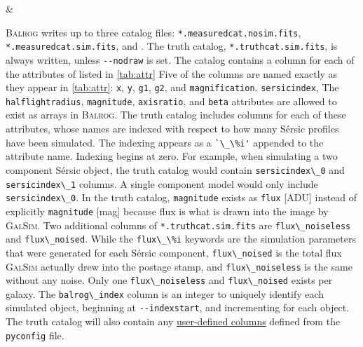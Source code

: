 \documentclass[11pt]{book}
\newcommand{\codett}[1]{\lstinline{#1}}
\newcommand{\galsim}{\textsc{GalSim}}
\newcommand{\balrog}{\textsc{Balrog}}
\newcommand{\opt}[1]{\codett{--#1}}
\newcommand{\sersic}{S\'{e}rsic}
\begin{document}
\begin{table}
\begin{longtabu}
 & \\
\bottomrule %
\end{longtabu}
\end{table}

\balrog{} writes up to three catalog files:
\codett{*.measuredcat.nosim.fits}, \codett{*.measuredcat.sim.fits}, and .
The truth catalog, \codett{*.truthcat.sim.fits}, is always written, unless \codett{--nodraw} is set.
The catalog contains a column for each of the attributes of listed in \autoref{tab:attr}
Five of the columns are named exactly as they appear in \autoref{tab:attr}: 
\codett{x}, \codett{y}, \codett{g1}, \codett{g2}, and \codett{magnification}.
\codett{sersicindex}, 
The \codett{halflightradius}, \codett{magnitude}, \codett{axisratio}, and \codett{beta}
attributes are allowed to exist as arrays in \balrog{}. 
The truth catalog includes columns for each of these attributes, whose names
are indexed with respect to how many \sersic{} profiles have been simulated.
The indexing appears as a \codett{`\_\%i'} appended to the attribute name.
Indexing begins at zero.
For example, when simulating a two component \sersic{} object, the truth catalog
would contain \codett{sersicindex\_0} and \codett{sersicindex\_1} columns.
A single component model would only include \codett{sersicindex\_0}.
In the truth catalog, \codett{magnitude} exists as \codett{flux} [ADU] instead
of explicitly \codett{magnitude} [mag] because flux is what is drawn into the image by \galsim{}.
Two additional columns of \codett{*.truthcat.sim.fits} are \codett{flux\_noiseless} and \codett{flux\_noised}.
While the \codett{flux\_\%i} keywords are the simulation parameters that were generated for each \sersic{} component,
\codett{flux\_noised} is the total flux \galsim{} actually drew into the postage stamp,
and \codett{flux\_noiseless} is the same without any noise.
Only one \codett{flux\_noiseless} and \codett{flux\_noised} exists per galaxy.
The \codett{balrog\_index} column is an integer to uniquely identify each simulated object, beginning at \opt{indexstart},
and incrementing for each object.
The truth catalog will also contain any \hyperlink{hyper:addtruth}{user-defined columns} defined from the \codett{pyconfig} file.
\end{document}
